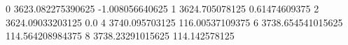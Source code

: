 0 3623.082275390625 -1.008056640625
1 3624.705078125 0.61474609375
2 3624.09033203125 0.0
4 3740.095703125 116.00537109375
6 3738.654541015625 114.564208984375
8 3738.23291015625 114.142578125

